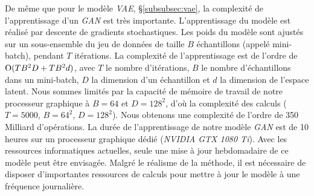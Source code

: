 De même que pour le modèle \textit{VAE}, §\ref{subsubsec:vae}, la complexité de l'apprentissage d'un \textit{GAN} est très importante.
L'apprentissage du modèle est réalisé par descente de gradients stochastiques.
Les poids du modèle sont ajustés sur un sous-ensemble du jeu de données de taille $B$ échantillons (appelé mini-batch), pendant $T$ itérations.
La complexité de l'apprentissage est de l'ordre de $\operatorname{O}(T B^2 D + T B^2 d)$, avec $T$ le nombre d'itérations, $B$ le nombre d'échantillons dans un mini-batch, $D$ la dimension d'un échantillon et $d$ la dimension de l'espace latent.
Nous sommes limités par la capacité de mémoire de travail de notre processeur graphique à $B=64$ et $D=128^2$, d'où la complexité des calculs ($T=5000$, $B=64^2$, $D=128^2$). Nous obtenons une complexité de l'ordre de 350 Milliard d'opérations.
La durée de l'apprentissage de notre modèle \textit{GAN} est de 10 heures sur un processeur graphique dédié (\textit{NVIDIA GTX 1080 Ti}).
Avec les ressources informatiques actuelles, seule une mise à jour hebdomadaire de ce modèle peut être envisagée.
Malgré le réalisme de la méthode, il est nécessaire de disposer d'importantes ressources de calculs pour mettre à jour le modèle à une fréquence journalière.





%



